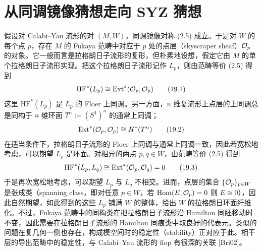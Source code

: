 
\section{从同调镜像猜想走向 SYZ 猜想}

假设对 Calabi--Yau 流形的对 $(M, W)$，同调镜像对称 (2.5) 成立。于是对 $W$ 的每个点 $p$，存在 $M$ 的 Fukaya 范畴中对应于 $p$ 处的点层（skyscraper sheaf）$\mathcal{O}_p$ 的对象。它一般而言是拉格朗日子流形的复形，但朴素地设想，假定它由 $M$ 的单个拉格朗日子流形实现。把这个拉格朗日子流形记作 $L_p$，则由范畴等价 (2.5) 得到
\begin{equation}
\mathrm{HF}^{*}(L_p) \cong \operatorname{Ext}^{*}(\mathcal{O}_p, \mathcal{O}_p) \tag{19.1}
\end{equation}
这里 $\mathrm{HF}^{*}(L_p)$ 是 $L_p$ 的 Floer 上同调。另一方面，$n$ 维复流形上点层的上同调总是同构于 $n$ 维环面 $T^n := (S^1)^n$ 的通常上同调；
\begin{equation}
\operatorname{Ext}^{*}(\mathcal{O}_p, \mathcal{O}_p) \cong H^{*}(T^n) \tag{19.2}
\end{equation}
在适当条件下，拉格朗日子流形的 Floer 上同调与通常上同调一致，因此若宽松地考虑，可以期望 $L_p$ 是环面。对相异的两点 $p, q \in W$，由范畴等价 (2.5) 得到
\begin{equation}
\mathrm{HF}^{*}(L_p, L_q) \cong \operatorname{Ext}^{*}(\mathcal{O}_p, \mathcal{O}_q) = 0 \tag{19.3}
\end{equation}
于是再次宽松地考虑，可以期望 $L_p$ 与 $L_q$ 不相交。进而，点层的集合 $\{\mathcal{O}_p\}_{p \in W}$ 是张成类（spanning class，即对任意 $p \in W$，若 $\operatorname{Hom}(E, \mathcal{O}_p) = 0$ 则 $E \cong 0$），因此自然期望，如此得到的这些 $L_p$ 铺满 $W$ 的整体，给出 $W$ 的拉格朗日环面纤维化。不过，Fukaya 范畴中的同构类在把拉格朗日子流形沿 Hamilton 同胚移动时不变，因此需要在拉格朗日子流形的 Hamilton 同痕类中取良好的代表元。类似的问题在复几何一侧也存在，构成模空间时的稳定性（stability）正对应于此。相干层的导出范畴中的稳定性，与 Calabi--Yau 流形的 flop 有很深的关联 [Bri02]。

